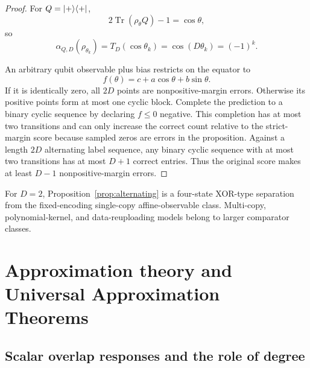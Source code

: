 \documentclass[pdflatex,sn-mathphys,NameDate,iicol]{sn-jnl}
\newcommand{\Tr}{\operatorname{Tr}}
\newcommand{\proj}[1]{\ket{#1}\!\bra{#1}}
\begin{document}
\begin{proof}
For $Q=\proj+$,
\begin{equation}
  2\Tr(\rho_{\theta}Q)-1=\cos\theta,
\end{equation}
so
\begin{equation}
  \alpha_{Q,D}(\rho_{\theta_k})
  =
  T_D(\cos\theta_k)
  =
  \cos(D\theta_k)
  =
  (-1)^k.
\end{equation}

An arbitrary qubit observable plus bias restricts on the equator to
\begin{equation}
  f(\theta)=c+a\cos\theta+b\sin\theta.
\end{equation}
If it is identically zero, all $2D$ points are nonpositive-margin errors.
Otherwise its positive points form at most one cyclic block. Complete the
prediction to a binary cyclic sequence by declaring $f\le0$ negative. This
completion has at most two transitions and can only increase the correct
count relative to the strict-margin score because sampled zeros are errors
in the proposition. Against a length $2D$ alternating label sequence, any
binary cyclic sequence with at most two transitions has at most $D+1$
correct entries. Thus the original score makes at least $D-1$
nonpositive-margin errors.
\end{proof}

\begin{remark}
For $D=2$, Proposition~\ref{prop:alternating} is a four-state XOR-type
separation from the fixed-encoding single-copy affine-observable class.
Multi-copy, polynomial-kernel, and data-reuploading models belong to larger
comparator classes.
\end{remark}

\section{Approximation theory and Universal Approximation Theorems}
\label{sec:approximation}

\subsection{Scalar overlap responses and the role of degree}
\end{document}
